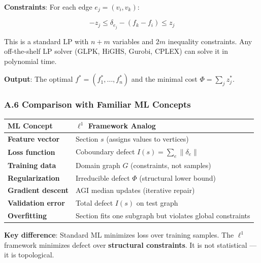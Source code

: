 \documentclass[
]{article}
\begin{document}
\textbf{Constraints}: For each edge \(e_j = (v_i, v_k)\):

\[-z_j \leq \delta_{e_j} - (f_k - f_i) \leq z_j\]

This is a standard LP with \(n + m\) variables and \(2m\) inequality
constraints. Any off-the-shelf LP solver (GLPK, HiGHS, Gurobi, CPLEX)
can solve it in polynomial time.

\textbf{Output}: The optimal \(f^* = (f_1^*, \ldots, f_n^*)\) and the
minimal cost \(\Phi = \sum_j z_j^*\).

\subsubsection{A.6 Comparison with Familiar ML
Concepts}\label{a.6-comparison-with-familiar-ml-concepts}

\begin{longtable}[]{@{}
  >{\raggedright\arraybackslash}p{}
  >{\raggedright\arraybackslash}p{}@{}}
\toprule\noalign{}
\begin{minipage}[b]{\linewidth}\raggedright
ML Concept
\end{minipage} & \begin{minipage}[b]{\linewidth}\raggedright
\(\ell^1\) Framework Analog
\end{minipage} \\
\midrule\noalign{}
\endhead
\bottomrule\noalign{}
\endlastfoot
\textbf{Feature vector} & Section \(s\) (assigns values to vertices) \\
\textbf{Loss function} & Coboundary defect
\(I(s) = \sum_e \|\delta_e\|\) \\
\textbf{Training data} & Domain graph \(G\) (constraints, not
samples) \\
\textbf{Regularization} & Irreducible defect \(\Phi\) (structural lower
bound) \\
\textbf{Gradient descent} & AGI median updates (iterative repair) \\
\textbf{Validation error} & Total defect \(I(s)\) on test graph \\
\textbf{Overfitting} & Section fits one subgraph but violates global
constraints \\
\end{longtable}

\textbf{Key difference}: Standard ML minimizes loss over training
samples. The \(\ell^1\) framework minimizes defect over
\textbf{structural constraints}. It is not statistical --- it is
topological.
\end{document}
